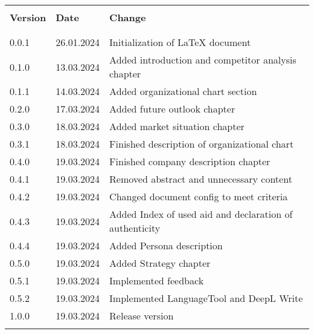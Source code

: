 \begin{table}[htp]
  \begin{tabularx}{\textwidth}{l l X}\hline                                                                  \\
    \textbf{Version} & \textbf{Date} & \textbf{Change}                                         \\ \\\hline \\
    0.0.1            & 26.01.2024    & Initialization of \LaTeX{} document                     \\
    0.1.0            & 13.03.2024    & Added introduction and competitor analysis chapter      \\
    0.1.1            & 14.03.2024    & Added organizational chart section                      \\
    0.2.0            & 17.03.2024    & Added future outlook chapter                            \\
    0.3.0            & 18.03.2024    & Added market situation chapter                          \\
    0.3.1            & 18.03.2024    & Finished description of organizational chart            \\
    0.4.0            & 19.03.2024    & Finished company description chapter                    \\
    0.4.1            & 19.03.2024    & Removed abstract and unnecessary content                \\
    0.4.2            & 19.03.2024    & Changed document config to meet criteria                \\
    0.4.3            & 19.03.2024    & Added Index of used aid and declaration of authenticity \\
    0.4.4            & 19.03.2024    & Added Persona description                               \\
    0.5.0            & 19.03.2024    & Added Strategy chapter                                  \\
    0.5.1            & 19.03.2024    & Implemented feedback                                    \\
    0.5.2            & 19.03.2024    & Implemented LanguageTool and DeepL Write                \\
    1.0.0            & 19.03.2024    & Release version                                         \\
    \\\hline
  \end{tabularx}
\end{table}
